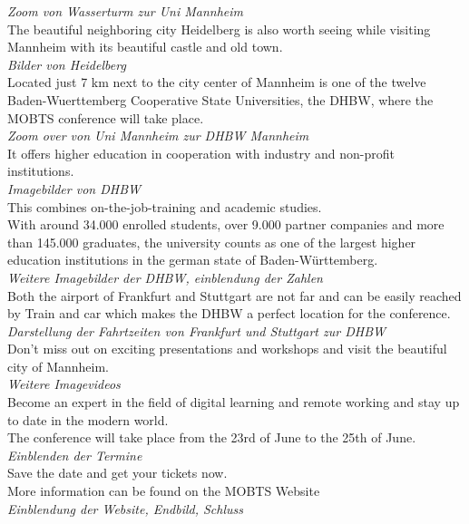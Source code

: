\textit{Zoom von Wasserturm zur Uni Mannheim}\\
The beautiful neighboring city Heidelberg is also worth seeing while visiting Mannheim with its beautiful castle and old town.\\
\textit{Bilder von Heidelberg}\\ 
Located just 7 km next to the city center of Mannheim is one of the twelve Baden-Wuerttemberg Cooperative State Universities, the DHBW, where the MOBTS conference will take place.\\
\textit{Zoom over von Uni Mannheim zur DHBW Mannheim}\\
It offers higher education in cooperation with industry and non-profit institutions.\\
\textit{Imagebilder von DHBW}\\
This combines on-the-job-training and academic studies.\\
With around 34.000 enrolled students, over 9.000 partner companies and more than 145.000 graduates, the university counts as one of the largest higher education institutions in the german state of Baden-Württemberg.\\
\textit{Weitere Imagebilder der DHBW, einblendung der Zahlen}\\
Both the airport of Frankfurt and Stuttgart are not far and can be easily reached by Train and car which makes the DHBW a perfect location for the conference.\\
\textit{Darstellung der Fahrtzeiten von Frankfurt und Stuttgart zur DHBW}\\
Don’t miss out on exciting presentations and workshops and visit the beautiful city of Mannheim.\\
\textit{Weitere Imagevideos}\\
Become an expert in the field of digital learning and remote working and stay up to date in the modern world.\\ 
The conference will take place from the 23rd of June to the 25th of June.\\
\textit{Einblenden der Termine}\\
Save the date and get your tickets now.\\
More information can be found on the MOBTS Website\\
\textit{Einblendung der Website, Endbild, Schluss}
